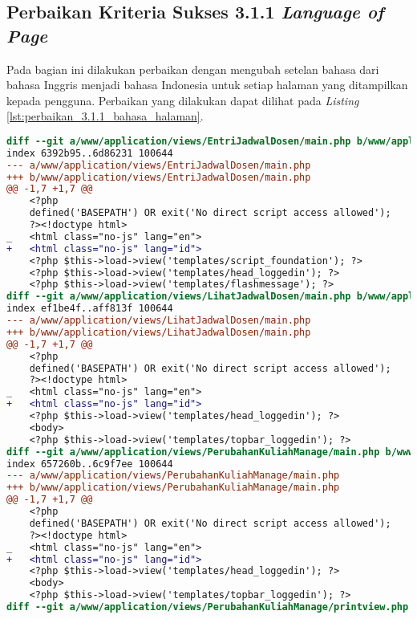 \subsection{Perbaikan Kriteria Sukses 3.1.1 \textit{Language of Page}}
\label{subsec:perbaikan_kriteria_sukses_3.1.1}
Pada bagian ini dilakukan perbaikan dengan mengubah setelan bahasa dari bahasa Inggris menjadi bahasa Indonesia untuk setiap halaman yang ditampilkan kepada pengguna. Perbaikan yang dilakukan dapat dilihat pada \textit{Listing} \ref{lst:perbaikan_3.1.1_bahasa_halaman}.

\begin{lstlisting}[frame=single, label={lst:perbaikan_3.1.1_bahasa_halaman}, language=diff, caption=Perbaikan Kriteria Sukses 3.1.1]
diff --git a/www/application/views/EntriJadwalDosen/main.php b/www/application/views/EntriJadwalDosen/main.php
index 6392b95..6d86231 100644
--- a/www/application/views/EntriJadwalDosen/main.php
+++ b/www/application/views/EntriJadwalDosen/main.php
@@ -1,7 +1,7 @@
    <?php
    defined('BASEPATH') OR exit('No direct script access allowed');
    ?><!doctype html>
_   <html class="no-js" lang="en">
+   <html class="no-js" lang="id">
    <?php $this->load->view('templates/script_foundation'); ?>
    <?php $this->load->view('templates/head_loggedin'); ?>
    <?php $this->load->view('templates/flashmessage'); ?>
diff --git a/www/application/views/LihatJadwalDosen/main.php b/www/application/views/LihatJadwalDosen/main.php
index ef1be4f..aff813f 100644
--- a/www/application/views/LihatJadwalDosen/main.php
+++ b/www/application/views/LihatJadwalDosen/main.php
@@ -1,7 +1,7 @@
    <?php
    defined('BASEPATH') OR exit('No direct script access allowed');
    ?><!doctype html>
_   <html class="no-js" lang="en">
+   <html class="no-js" lang="id">
    <?php $this->load->view('templates/head_loggedin'); ?>
    <body>
    <?php $this->load->view('templates/topbar_loggedin'); ?>
diff --git a/www/application/views/PerubahanKuliahManage/main.php b/www/application/views/PerubahanKuliahManage/main.php
index 657260b..6c9f7ee 100644
--- a/www/application/views/PerubahanKuliahManage/main.php
+++ b/www/application/views/PerubahanKuliahManage/main.php
@@ -1,7 +1,7 @@
    <?php
    defined('BASEPATH') OR exit('No direct script access allowed');
    ?><!doctype html>
_   <html class="no-js" lang="en">
+   <html class="no-js" lang="id">
    <?php $this->load->view('templates/head_loggedin'); ?>
    <body>
    <?php $this->load->view('templates/topbar_loggedin'); ?>
diff --git a/www/application/views/PerubahanKuliahManage/printview.php b/www/application/views/PerubahanKuliahManage/printview.php

\end{lstlisting}
